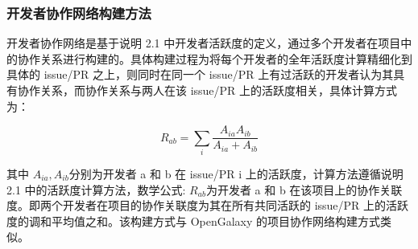 \subsubsection{​开发者协作网络构建方法}
开发者协作网络是基于说明 2.1 中开发者活跃度的定义，通过多个开发者在项目中的协作关系进行构建的。具体构建过程为将每个开发者的全年活跃度计算精细化到具体的 issue/PR 之上，则同时在同一个 issue/PR 上有过活跃的开发者认为其具有协作关系，而协作关系与两人在该 issue/PR 上的活跃度相关，具体计算方式为：

$$ R_{ab}=\sum_{i}{\frac{A_{ia}A_{ib}}{A_{ia}+A_{ib}}} $$

其中 $ A_{ia}, A_{ib} $分别为开发者 a 和 b 在 issue/PR i 上的活跃度，计算方法遵循说明 2.1 中的活跃度计算方法，数学公式: $ R_{ab} $为开发者 a 和 b 在该项目上的协作关联度。即两个开发者在项目的协作关联度为其在所有共同活跃的 issue/PR 上的活跃度的调和平均值之和。该构建方式与 OpenGalaxy 的项目协作网络构建方式类似。








